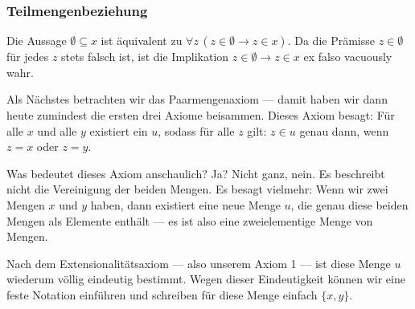 \subsubsection{Teilmengenbeziehung}
\begin{math-stroke}



\begin{short-proof}
Die Aussage $\emptyset \subseteq x$ ist äquivalent zu $\forall z \, (z \in \emptyset \rightarrow z \in x)$. Da die Prämisse $z \in \emptyset$ für jedes $z$ stets falsch ist, ist die Implikation $z \in \emptyset \rightarrow z \in x$ ex falso vacuously wahr.
\end{short-proof}
\end{math-stroke}

\begin{ai-global-state-checkpoint-invisible-content}
\end{ai-global-state-checkpoint-invisible-content}

\begin{spoken-clean}[01:26:22 - 01:29:00]
Als Nächstes betrachten wir das Paarmengenaxiom --- damit haben wir dann heute zumindest die ersten drei Axiome beisammen. Dieses Axiom besagt: Für alle $x$ und alle $y$ existiert ein $u$, sodass für alle $z$ gilt: $z \in u$ genau dann, wenn $z = x$ oder $z = y$.

Was bedeutet dieses Axiom anschaulich? Ja?
Nicht ganz, nein. Es beschreibt nicht die Vereinigung der beiden Mengen. Es besagt vielmehr: Wenn wir zwei Mengen $x$ und $y$ haben, dann existiert eine neue Menge $u$, die genau diese beiden Mengen als Elemente enthält --- es ist also eine zweielementige Menge von Mengen.

Nach dem Extensionalitätsaxiom --- also unserem Axiom 1 --- ist diese Menge $u$ wiederum völlig eindeutig bestimmt. Wegen dieser Eindeutigkeit können wir eine feste Notation einführen und schreiben für diese Menge einfach $\{x, y\}$.
\end{spoken-clean}

